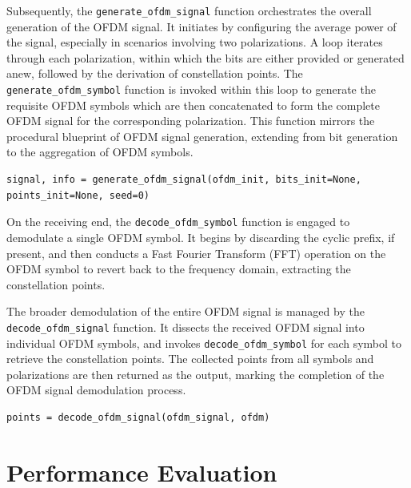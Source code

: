 Subsequently, the \texttt{generate\_ofdm\_signal} function orchestrates the overall generation of the OFDM signal. It initiates by configuring the average power of the signal, especially in scenarios involving two polarizations. A loop iterates through each polarization, within which the bits are either provided or generated anew, followed by the derivation of constellation points. The \texttt{generate\_ofdm\_symbol} function is invoked within this loop to generate the requisite OFDM symbols which are then concatenated to form the complete OFDM signal for the corresponding polarization. This function mirrors the procedural blueprint of OFDM signal generation, extending from bit generation to the aggregation of OFDM symbols.

\begin{lstlisting}
signal, info = generate_ofdm_signal(ofdm_init, bits_init=None, points_init=None, seed=0)
\end{lstlisting}

On the receiving end, the \texttt{decode\_ofdm\_symbol} function is engaged to demodulate a single OFDM symbol. It begins by discarding the cyclic prefix, if present, and then conducts a Fast Fourier Transform (FFT) operation on the OFDM symbol to revert back to the frequency domain, extracting the constellation points.

The broader demodulation of the entire OFDM signal is managed by the \texttt{decode\_ofdm\_signal} function. It dissects the received OFDM signal into individual OFDM symbols, and invokes \texttt{decode\_ofdm\_symbol} for each symbol to retrieve the constellation points. The collected points from all symbols and polarizations are then returned as the output, marking the completion of the OFDM signal demodulation process.

\begin{lstlisting}
points = decode_ofdm_signal(ofdm_signal, ofdm)
\end{lstlisting}





\section{Performance Evaluation}

